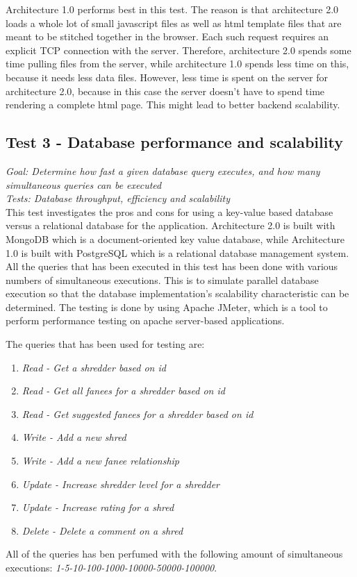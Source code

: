 Architecture 1.0 performs best in this test. The reason is that architecture 2.0 loads a whole lot of small javascript files as well as html template files that are meant to be stitched together in the browser. Each such request requires an explicit TCP connection with the server. Therefore, architecture 2.0 spends some time pulling files from the server, while architecture 1.0 spends less time on this, because it needs less data files. However, less time is spent on the server for architecture 2.0, because in this case the server doesn't have to spend time rendering a complete html page. This might lead to better backend scalability.



\subsection{Test 3 - Database performance and scalability}
\textit{Goal: Determine how fast a given database query executes, and how many simultaneous queries can be executed}\\
\textit{Tests: Database throughput, efficiency and scalability}\\
This test investigates the pros and cons for using a key-value based database versus a relational database for the application. Architecture 2.0 is built with MongoDB \cite{mongo} which is a document-oriented key value database, while Architecture 1.0 is built with PostgreSQL\cite{postgresql} which is a relational database management system. All the queries that has been executed in this test has been done with various numbers of simultaneous executions. This is to simulate parallel database execution so that the database implementation's scalability characteristic can be determined. The testing is done by using Apache JMeter, which is a tool to perform performance testing on apache server-based applications. 

The queries that has been used for testing are:

\begin{enumerate}
\item \textit{Read - Get a shredder based on id}
\item \textit{Read - Get all fanees for a shredder based on id}
\item \textit{Read - Get suggested fanees for a shredder based on id}
\item \textit{Write - Add a new shred}
\item \textit{Write - Add a new fanee relationship}
\item \textit{Update - Increase shredder level for a shredder}
\item \textit{Update - Increase rating for a shred}
\item \textit{Delete - Delete a comment on a shred}
\end{enumerate}

All of the queries has ben perfumed with the following amount of simultaneous executions: \textit{1-5-10-100-1000-10000-50000-100000}.


